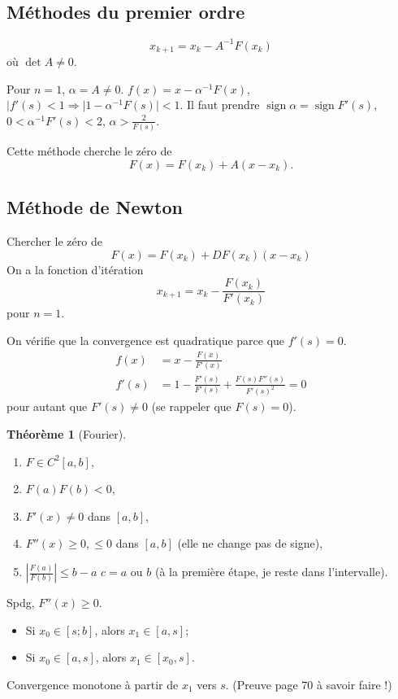 \documentclass[11pt,a4paper]{article}
\theoremstyle{definition}
\newtheorem{mytheo}[mydef]{Théorème}
\DeclareMathOperator{\sign}{sign}
\begin{document}
\subsection{Méthodes du premier ordre}
$$x_{k+1} = x_k - A^{-1}F(x_k)$$
où $\det A \neq 0$.

Pour $n = 1$, $\alpha = A \neq 0$.
$f(x) = x - \alpha^{-1}F(x)$,
$|f'(s) < 1 \Rightarrow |1 - \alpha^{-1}F(s)| < 1$.
Il faut prendre $\sign \alpha = \sign F'(s)$, $0 < \alpha^{-1}F'(s) < 2$,
$\alpha > \frac{2}{F(s)}$.

Cette méthode cherche le zéro de
$$F(x) = F(x_k) + A(x-x_k).$$

\subsection{Méthode de Newton}
Chercher le zéro de
$$F(x) = F(x_k) + DF(x_k)(x-x_k)$$
On a la fonction d'itération
$$x_{k+1} = x_k - \frac{F(x_k)}{F'(x_k)}$$
pour $n = 1$.

On vérifie que la convergence est quadratique parce que $f'(s) = 0$.
\begin{align*}
  f(x) & = x - \frac{F(x)}{F'(x)}\\
  f'(s) & = 1 - \frac{F'(s)}{F'(s)} + \frac{F(s)F''(s)}{F'(s)^2} = 0
\end{align*}
pour autant que $F'(s) \neq 0$ (se rappeler que $F(s) = 0$).

\begin{mytheo}[Fourier]
  \begin{enumerate}
    \item $F \in C^2[a,b]$,
    \item $F(a)F(b) < 0$,
    \item $F'(x) \neq 0$ dans $[a,b]$,
    \item $F''(x) \geq 0,\leq 0$ dans $[a,b]$ (elle ne change pas de signe),
    \item $\left|\frac{F(a)}{F(b)}\right| \leq b-a$ $c = a$ ou $b$
      (à la première étape, je reste dans l'intervalle).
  \end{enumerate}
  Spdg, $F''(x) \geq 0$.
  \begin{itemize}
    \item Si $x_0 \in [s;b]$, alors $x_1 \in [a,s]$;
    \item Si $x_0 \in [a,s]$, alors $x_1 \in [x_0,s]$.
  \end{itemize}
  Convergence monotone à partir de $x_1$ vers $s$.
  (Preuve page 70 à savoir faire !)
\end{mytheo}
\end{document}
